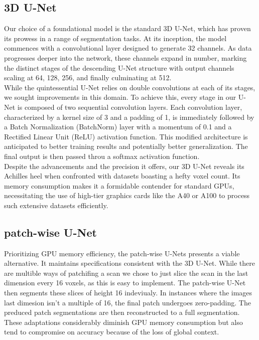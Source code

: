 \subsection{3D U-Net}
Our choice of a foundational model is the standard 3D U-Net, which has proven its prowess in a range of segmentation tasks.
At its inception, the model commences with a convolutional layer designed to generate 32 channels. As data progresses deeper into the network,
these channels expand in number, marking the distinct stages of the descending U-Net structure with output channels scaling at 64, 128, 256, and finally culminating at 512.\\[1ex]
While the quintessential U-Net relies on double convolutions at each of its stages, we sought improvements in this domain. To achieve this,
every stage in our U-Net is composed of two sequential convolution layers. Each convolution layer, characterized by a kernel size of 3 and a padding of 1,
is immediately followed by a Batch Normalization (BatchNorm) layer with a momentum of 0.1 and a Rectified Linear Unit (ReLU) activation function.
This modified architecture is anticipated to better training results and potentially better generalization.\cite[7-8]{ioffe_batch_2015} The final output is then passed throu a softmax activation function.\\[1ex]
Despite the advancements and the precision it offers, our 3D U-Net reveals its Achilles heel when confronted with datasets boasting a hefty voxel count.
Its memory consumption makes it a formidable contender for standard GPUs, necessitating the use of high-tier graphics cards like the A40 or A100 to process such extensive datasets efficiently.

\subsection{patch-wise U-Net}
Prioritizing GPU memory efficiency, the patch-wise U-Nets presents a viable alternative. It maintains specifications consistent with the 3D U-Net.
While there are multible ways of patchifing a scan we chose to just slice the scan in the last dimension every 16 voxels, as this is easy to implement. The patch-wise U-Net then segments these slices of height 16 indeviualy.
In instances where the images last dimesion isn't a multiple of 16, the final patch undergoes zero-padding.
The preduced patch segmentations are then reconstructed to a full segmentation.
These adaptations considerably diminish GPU memory consumption but also tend to compromise on accuracy because of the loss of global context.

